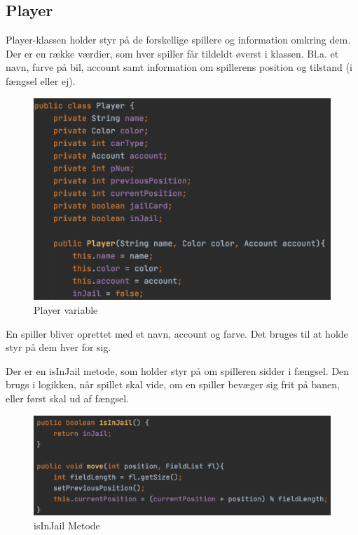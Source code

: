 \subsection{Player}

Player-klassen holder styr på de forskellige spillere og information omkring dem.  Der er en række værdier, som hver spiller får tildeldt øverst i klassen. Bl.a. et navn, farve på bil, account samt information om spillerens position og tilstand (i fængsel eller ej).
\begin{figure}[H]
    \centering
    \includegraphics[width=\textwidth]{sources/7_implementering/Player Properties.png}
    \caption{Player variable}
    \label{fig:playVariable}
\end{figure}
En spiller bliver oprettet med et navn, account og farve. Det bruges til at holde styr på dem hver for sig.

Der er en isInJail metode, som holder styr på om spilleren sidder i fængsel. Den brugs i logikken, når spillet skal vide, om en spiller bevæger sig frit på banen, eller først skal ud af fængsel.
\begin{figure}[H]
    \centering
    \includegraphics[width=\textwidth]{sources/7_implementering/Player isInJail.png}
    \caption{isInJail Metode}
    \label{fig:isInJail}
\end{figure}

